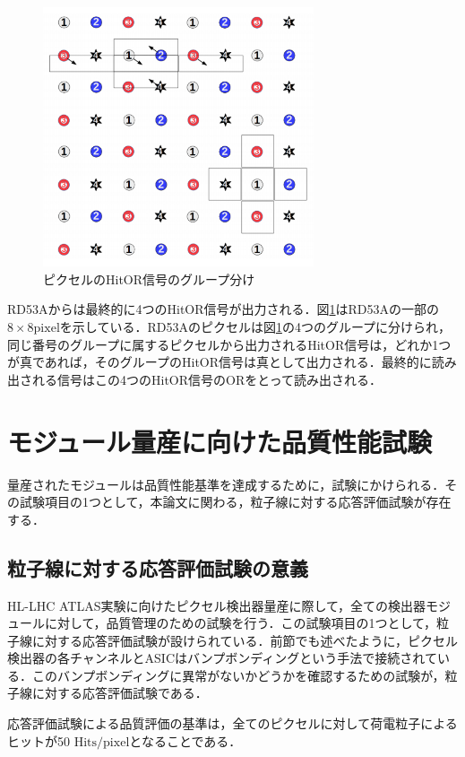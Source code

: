\begin{figure}[h]
  \centering
  \includegraphics[width=8cm]{./figure/HitOR.png}
  \caption{ピクセルのHitOR信号のグループ分け\cite{Garcia-Sciveres:2287593}}
  \label{fig:HitOR}
\end{figure}

RD53Aからは最終的に4つのHitOR信号が出力される．図\ref{fig:HitOR}はRD53Aの一部の$8 \times 8 \mathrm{pixel}$を示している．RD53Aのピクセルは図\ref{fig:HitOR}の4つのグループに分けられ，同じ番号のグループに属するピクセルから出力されるHitOR信号は，どれか1つが真であれば，そのグループのHitOR信号は真として出力される．最終的に読み出される信号はこの4つのHitOR信号のORをとって読み出される．


\section{モジュール量産に向けた品質性能試験}
\label{sec:moduletest}
量産されたモジュールは品質性能基準を達成するために，試験にかけられる．その試験項目の1つとして，本論文に関わる，粒子線に対する応答評価試験が存在する．

\subsection{粒子線に対する応答評価試験の意義}
HL-LHC ATLAS実験に向けたピクセル検出器量産に際して，全ての検出器モジュールに対して，品質管理のための試験を行う．この試験項目の1つとして，粒子線に対する応答評価試験が設けられている．前節でも述べたように，ピクセル検出器の各チャンネルとASICはバンプボンディングという手法で接続されている．このバンプボンディングに異常がないかどうかを確認するための試験が，粒子線に対する応答評価試験である．\par
応答評価試験による品質評価の基準は，全てのピクセルに対して荷電粒子によるヒットが50 $\mathrm{Hits/pixel}$となることである．\cite{ATLCOMIT61:online}

